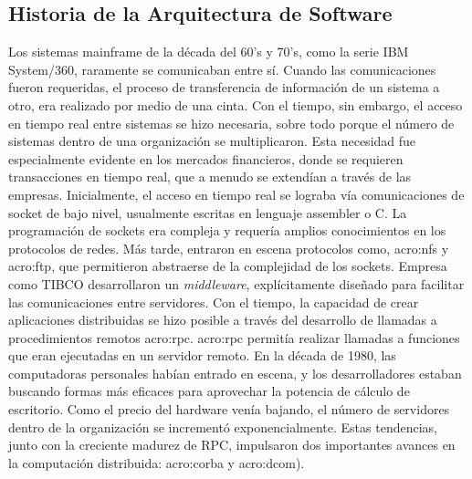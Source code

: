 \subsection{Historia de la Arquitectura de Software}
\label{soa:historia}

Los sistemas mainframe de la década del 60’s y 70’s, como la serie IBM System/360, raramente se comunicaban entre sí.  Cuando las comunicaciones fueron requeridas, el proceso de transferencia de información de un sistema a otro, era realizado por medio de una cinta.  Con el tiempo, sin embargo, el acceso en tiempo real entre sistemas se hizo necesaria, sobre todo porque el número de sistemas dentro de una organización se multiplicaron. Esta necesidad fue especialmente evidente en los mercados financieros, donde se requieren transacciones en tiempo real, que a menudo se extendían a través de las empresas.
Inicialmente, el acceso en tiempo real se lograba vía comunicaciones de socket de bajo nivel, usualmente escritas en lenguaje assembler o C.  La programación de sockets era compleja y requería amplios conocimientos en los protocolos de redes.  Más tarde, entraron en escena protocolos como, \gls{acro:nfs} y \gls{acro:ftp}, que permitieron abstraerse de la complejidad de los sockets.
Empresa como TIBCO desarrollaron un \textit{middleware}, explícitamente diseñado para facilitar las comunicaciones entre servidores.  Con el tiempo, la capacidad de crear aplicaciones distribuidas se hizo posible a través del desarrollo de llamadas a procedimientos remotos \gls{acro:rpc}. \gls{acro:rpc} permitía realizar llamadas a funciones que eran ejecutadas en un servidor remoto.
En la década de 1980, las computadoras personales habían entrado en escena, y los desarrolladores estaban buscando formas más eficaces para aprovechar la potencia de cálculo de escritorio. Como el precio del hardware venía bajando, el número de servidores dentro de la organización se incrementó exponencialmente. Estas tendencias, junto con la creciente madurez de RPC, impulsaron dos importantes avances en la computación distribuida: \gls{acro:corba} y \gls{acro:dcom}).

